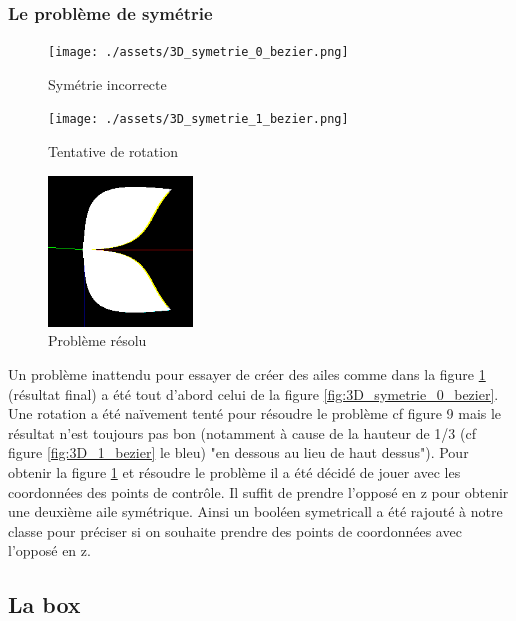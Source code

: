 \documentclass{article}
\begin{document}
\subsubsection{Le problème de symétrie}

\begin{figure}[!htb]
	\centering
	\begin{minipage}{0.3\textwidth}
    	\centering
    	\texttt{[image: ./assets/3D\_symetrie\_0\_bezier.png]}
    	\caption{Symétrie incorrecte}
    	\label{fig:3D_symetrie_0_bezier}
	\end{minipage}
	\begin{minipage}{0.3\textwidth}
    	\centering
    	\texttt{[image: ./assets/3D\_symetrie\_1\_bezier.png]}
    	\caption{Tentative de rotation}
    	\label{fig:3D_symetrie_1_bezier}
	\end{minipage}
	\begin{minipage}{0.3\textwidth}
    	\centering
    	\includegraphics[height=4cm]{./assets/3D_symetrie_2_bezier.png}
    	\caption{Problème résolu}
    	\label{fig:3D_symetrie_2_bezier}
	\end{minipage}
\end{figure}

Un problème inattendu pour essayer de créer des ailes comme dans la figure \ref{fig:3D_symetrie_2_bezier} (résultat final) a été tout d'abord celui de la figure \ref{fig:3D_symetrie_0_bezier}. Une rotation a été naïvement tenté pour résoudre le problème cf figure 9 mais le résultat n'est toujours pas bon (notamment à cause de la hauteur de 1/3 (cf figure \ref{fig:3D_1_bezier} le bleu) "en dessous au lieu de haut dessus"). Pour obtenir la figure \ref{fig:3D_symetrie_2_bezier} et résoudre le problème il a été décidé de jouer avec les coordonnées des points de contrôle. Il suffit de prendre l'opposé en z pour obtenir une deuxième aile symétrique. Ainsi un booléen symetricall a été rajouté à notre classe pour préciser si on souhaite prendre des points de coordonnées avec l'opposé en z. 

\subsection{La box}
\end{document}
